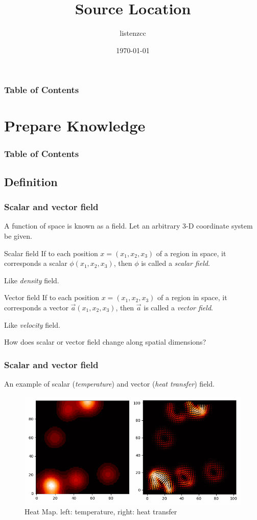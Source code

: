 \documentclass{beamer}
\title{Source Location}
\author{listenzcc \inst{1}}
\institute[VFU] %
{
  \inst{1}
  Very Famous University
}
\date{\today}
\begin{document}
\frame{\titlepage}

\begin{frame}
    \frametitle{Table of Contents}
    \tableofcontents[hideallsubsections]
\end{frame}

\section{Prepare Knowledge}
\begin{frame}
    \frametitle{Table of Contents}
\end{frame}
\subsection{Definition}

\begin{frame}
    \frametitle{Scalar and vector field}
    A function of space is known as a field.
    Let an arbitrary 3-D coordinate system be given.

    \begin{block}{Scalar field}
        If to each position $x = (x_{1}, x_{2}, x_{3})$ of a region in space, it corresponds a scalar $\phi (x_{1}, x_{2}, x_{3})$, then $\phi$ is called a \emph{scalar field}.

        Like \emph{density} field.
    \end{block}

    \begin{block}{Vector field}
        If to each position $x = (x_{1}, x_{2}, x_{3})$ of a region in space, it corresponds a vector $\vec{a} (x_{1}, x_{2}, x_{3})$, then $\vec{a}$ is called a \emph{vector field}.

        Like \emph{velocity} field.
    \end{block}

    How does scalar or vector field change along spatial dimensions?
\end{frame}

\begin{frame}
    \frametitle{Scalar and vector field}
    An example of scalar (\emph{temperature}) and vector (\emph{heat transfer}) field.
    \begin{figure}[H]
        \centering
        \includegraphics[height=0.5\textheight]{heatmap.png}
        \caption{Heat Map. left: temperature, right: heat transfer}
        \label{fig: Heat map}
    \end{figure}
\end{frame}
\end{document}
